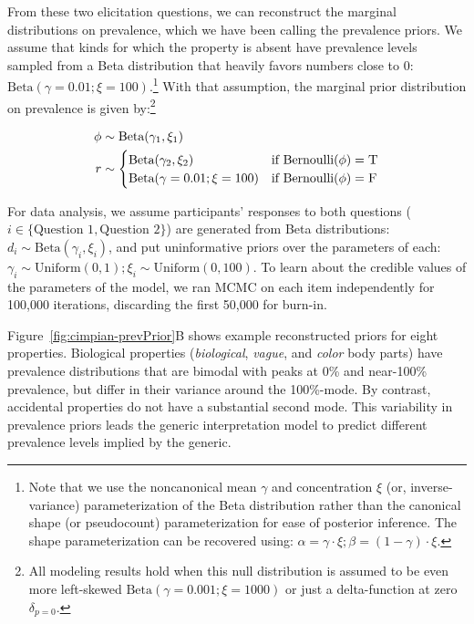 \documentclass[floatsintext,doc]{apa6}
\let\rmarkdownfootnote\footnote%
\def\footnote{\protect\rmarkdownfootnote}
\begin{document}
From these two elicitation questions, we can reconstruct the marginal distributions on prevalence, which we have been calling the prevalence priors.
We assume that kinds for which the
property is absent have prevalence levels sampled from a Beta
distribution that heavily favors numbers close to 0:
\(\text{Beta}(\gamma = 0.01; \xi = 100)\).\footnote{Note that we use the
  noncanonical mean \(\gamma\) and concentration \(\xi\) (or,
  inverse-variance) parameterization of the Beta distribution rather
  than the canonical shape (or pseudocount) parameterization for ease of
  posterior inference. The shape parameterization can be recovered
  using: \(\alpha = \gamma \cdot \xi; \beta = (1 - \gamma) \cdot \xi\).}
With that assumption, the marginal prior distribution on prevalence is given by:\footnote{All
  modeling results hold when this null distribution is assumed to be
  even more left-skewed \(\text{Beta}(\gamma = 0.001; \xi = 1000)\) or
  just a delta-function at zero \(\delta_{p=0}\).}

\begin{align}
\phi & \sim \text{Beta}(\gamma_1, \xi_1) \nonumber \\ 
r & \sim \begin{cases}
        \text{Beta}(\gamma_2, \xi_2) &\mbox{if } \text{Bernoulli}(\phi) = \textsc{T} \label{eq:priorModel}  \\
        \text{Beta}(\gamma = 0.01; \xi = 100) &\mbox{if } \text{Bernoulli}(\phi) = \textsc{F} \\
        \end{cases}
\end{align}

For data analysis, we assume participants' responses to both questions
(\(i \in \{\text{Question 1}, \text{Question 2}\}\)) are generated from
Beta distributions: \(d_{i} \sim \text{Beta}(\gamma_i, \xi_i)\), and put
uninformative priors over the parameters of each:
\(\gamma_i \sim \text{Uniform}(0, 1); \xi_i \sim \text{Uniform}(0, 100)\).
To learn
about the credible values of the parameters of the model, we ran MCMC on
each item independently for 100,000 iterations, discarding the first
50,000 for burn-in.

Figure~\ref{fig:cimpian-prevPrior}B shows example reconstructed priors for eight properties.
Biological properties (\emph{biological}, \emph{vague}, and \emph{color}
body parts) have prevalence distributions that are bimodal with peaks at
0\% and near-100\% prevalence, but differ in their variance around the
100\%-mode. By contrast, accidental properties do not have a substantial
second mode. This variability in prevalence priors leads the generic
interpretation model to predict different prevalence levels implied by
the generic.
\end{document}

